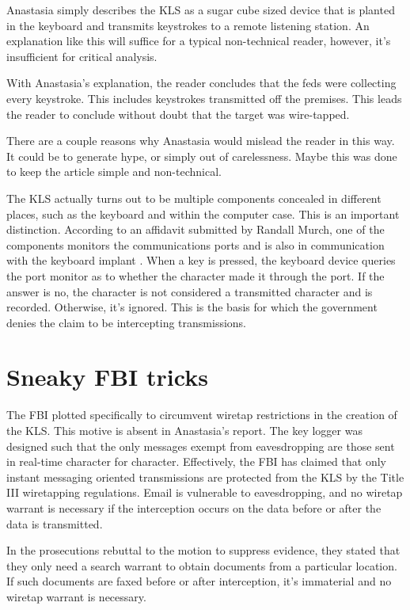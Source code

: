 ﻿\documentclass[12pt,titlepage]{article}             %
\begin{document}
  Anastasia simply describes the KLS as a sugar cube sized device that
  is planted in the keyboard and transmits keystrokes to a remote
  listening station.  An explanation like this will suffice for a
  typical non-technical reader, however, it's insufficient for
  critical analysis.
  
  With Anastasia's explanation, the reader concludes that the feds
  were collecting every keystroke.  This includes keystrokes
  transmitted off the premises.  This leads the reader to conclude
  without doubt that the target was wire-tapped.

  There are a couple reasons why Anastasia would mislead the reader in
  this way.  It could be to generate hype, or simply out of
  carelessness.  Maybe this was done to keep the article simple and
  non-technical.  
  
  The KLS actually turns out to be multiple components concealed in
  different places, such as the keyboard and within the computer case.
  This is an important distinction.  According to an affidavit
  submitted by Randall Murch, one of the components monitors the
  communications ports and is also in communication with the keyboard
  implant \cite{RANDALL}.  When a key is pressed, the keyboard device
  queries the port monitor as to whether the character made it through
  the port.  If the answer is no, the character is not considered a
  transmitted character and is recorded.  Otherwise, it's ignored.
  This is the basis for which the government denies the claim to be
  intercepting transmissions.

  \section{Sneaky FBI tricks}
  
  The FBI plotted specifically to circumvent wiretap restrictions in
  the creation of the KLS.  This motive is absent in Anastasia's
  report.  The key logger was designed such that the only messages
  exempt from eavesdropping are those sent in real-time character for
  character.  Effectively, the FBI has claimed that only instant
  messaging oriented transmissions are protected from the KLS by the
  Title III wiretapping regulations.  Email is vulnerable to
  eavesdropping, and no wiretap warrant is necessary if the
  interception occurs on the data before or after the data is
  transmitted.

  In the prosecutions rebuttal to the motion to suppress evidence,
  they stated that they only need a search warrant to obtain documents
  from a particular location.  If such documents are faxed before or
  after interception, it's immaterial and no wiretap warrant is
  necessary.  
  
\end{document}
